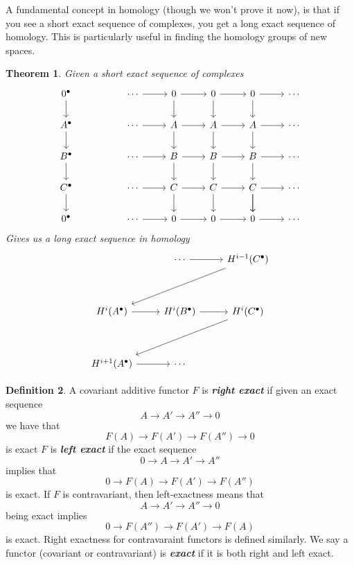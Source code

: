 \documentclass[psamsfonts]{amsart}
\newtheorem{thm}{Theorem}[section]
\theoremstyle{definition}
\newtheorem{defn}[thm]{Definition}
\theoremstyle{remark}
\newcommand{\ib}[1]{\textbf{\textit{#1}}}
\begin{document}
%
A fundamental concept in homology (though we won't prove it now), is that if you see a short exact sequence of complexes, you get a long exact sequence of homology. This is particularly useful in finding the homology groups of new spaces.
%
\begin{thm}
Given a short exact sequence of complexes
$$\begin{tikzcd}
0^\bullet \arrow[d]& & \cdots \arrow[r] & 0 \arrow[d] \arrow[r] & 0 \arrow[d] \arrow[r] & 0 \arrow[d] \arrow[r] & \cdots \\
A^\bullet \arrow[d] & & \cdots \arrow[r] & A \arrow[d] \arrow[r] & A \arrow[d] \arrow[r] & A \arrow[d] \arrow[r] & \cdots \\
B^\bullet \arrow[d] & & \cdots \arrow[r] & B \arrow[d] \arrow[r] & B \arrow[d] \arrow[r] & B \arrow[d] \arrow[r] & \cdots \\
C^\bullet \arrow[d] & & \cdots \arrow[r] & C \arrow[d] \arrow[r] & C \arrow[d] \arrow[r] & C \arrow[d]\arrow[r] \arrow[d] & \cdots \\
0^\bullet & & \cdots \arrow[r] & 0 \arrow[r] & 0 \arrow[r] & 0 \arrow[r] & \cdots
\end{tikzcd}$$
Gives us a long exact sequence in homology
$$\begin{tikzcd}
& \cdots \ar[r] & H^{i-1}(C^\bullet) \ar[ddll] \\\\
H^i(A^\bullet) \ar[r] & H^i(B^\bullet) \ar[r] & H^i(C^\bullet) \ar[ddll] \\\\
H^{i+1}(A^\bullet) \ar[r] & \cdots
\end{tikzcd}$$
\end{thm}
%
\begin{defn}
A covariant additive functor $F$ is \ib{right exact} if given an exact sequence
$$A \to A' \to A'' \to 0 $$
we have that 
$$F(A) \to F(A') \to F(A'') \to 0 $$
is exact
$F$ is \ib{left exact} if the exact sequence
$$0 \to A \to A' \to A'' $$
implies that 
$$0 \to F(A) \to F(A') \to F(A'') $$
is exact. If $F$ is contravariant, then left-exactness means that
$$A \to A' \to A'' \to 0 $$
being exact implies
$$0 \to F(A'') \to F(A') \to F(A)$$
is exact. Right exactness for contravaraint functors is defined similarly. We say a functor (covariant or contravariant) is \ib{exact} if it is both right and left exact.
\end{defn}
%
\end{document}
